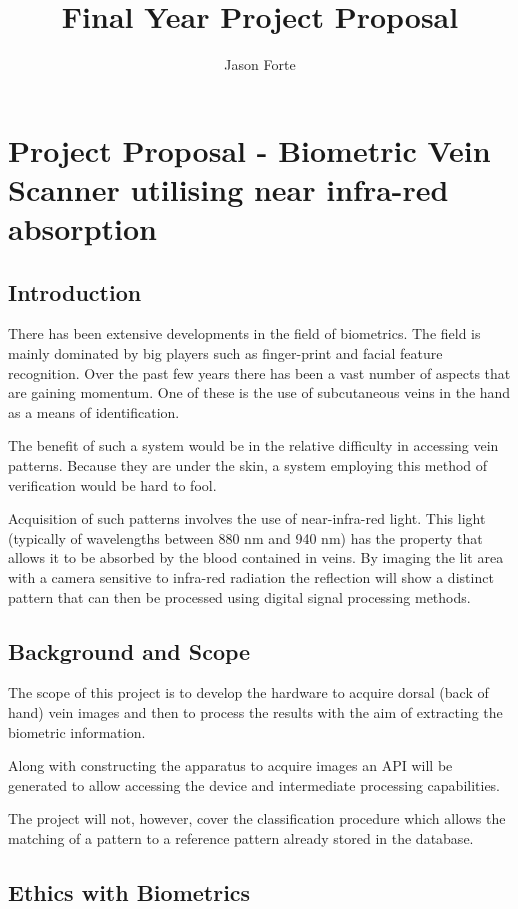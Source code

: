 \documentclass[10pt,a4paper,twoside,noindent]{report}
\author{Jason Forte}
\title{Final Year Project Proposal}
\begin{document}
\section*{Project Proposal - Biometric Vein Scanner utilising near infra-red absorption}
\subsection*{Introduction}
\thispagestyle{empty}

There has been extensive developments in the field of biometrics. The field is mainly dominated by big players such as finger-print and facial feature recognition. Over the past few years there has been a vast number of aspects that are gaining momentum. One of these is the use of subcutaneous veins in the hand as a means of identification.

The benefit of such a system would be in the relative difficulty in accessing vein patterns. Because they are under the skin, a system employing this method of verification would be hard to fool.

Acquisition of such patterns involves the use of near-infra-red light. This light (typically of wavelengths between 880 nm and 940 nm) has the property that allows it to be absorbed by the blood contained in veins. By imaging the lit area with a camera sensitive to infra-red radiation the reflection will show a distinct pattern that can then be processed using digital signal processing methods.

\subsection*{Background and Scope}

The scope of this project is to develop the hardware to acquire dorsal (back of hand) vein images and then to process the results with the aim of extracting the biometric information.

Along with constructing the apparatus to acquire images an API will be generated to allow accessing the device and intermediate processing capabilities.

The project will not, however, cover the classification procedure which allows the matching of a pattern to a reference pattern already stored in the database.

\subsection*{Ethics with Biometrics}
\end{document}
